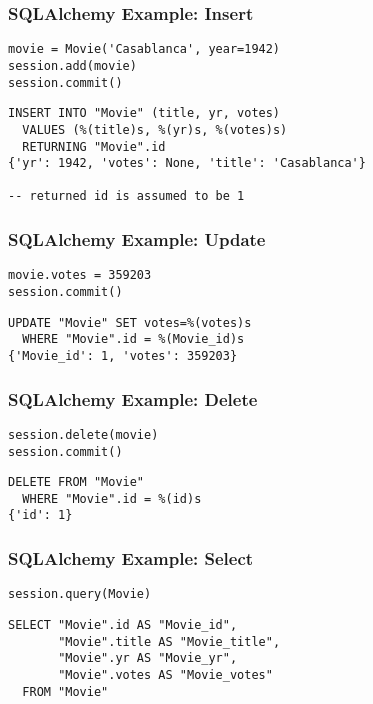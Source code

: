 \documentclass[dvipsnames]{beamer}
\theoremstyle{plain}
\begin{document}
\begin{frame}[fragile]
  \frametitle{SQLAlchemy Example: Insert}

  \begin{lstlisting}
movie = Movie('Casablanca', year=1942)
session.add(movie)
session.commit()
  \end{lstlisting}

  \begin{lstlisting}[language=FullSQL]
INSERT INTO "Movie" (title, yr, votes)
  VALUES (%(title)s, %(yr)s, %(votes)s)
  RETURNING "Movie".id
{'yr': 1942, 'votes': None, 'title': 'Casablanca'}

-- returned id is assumed to be 1
  \end{lstlisting}
\end{frame}

\begin{frame}[fragile]
  \frametitle{SQLAlchemy Example: Update}

  \begin{lstlisting}
movie.votes = 359203
session.commit()
  \end{lstlisting}

  \begin{lstlisting}[language=FullSQL]
UPDATE "Movie" SET votes=%(votes)s
  WHERE "Movie".id = %(Movie_id)s
{'Movie_id': 1, 'votes': 359203}
  \end{lstlisting}
\end{frame}

\begin{frame}[fragile]
  \frametitle{SQLAlchemy Example: Delete}

  \begin{lstlisting}
session.delete(movie)
session.commit()
  \end{lstlisting}

  \begin{lstlisting}[language=FullSQL]
DELETE FROM "Movie"
  WHERE "Movie".id = %(id)s
{'id': 1}
  \end{lstlisting}
\end{frame}

\begin{frame}[fragile]
  \frametitle{SQLAlchemy Example: Select}

  \begin{lstlisting}
session.query(Movie)
  \end{lstlisting}

  \begin{lstlisting}[language=FullSQL]
SELECT "Movie".id AS "Movie_id",
       "Movie".title AS "Movie_title",
       "Movie".yr AS "Movie_yr",
       "Movie".votes AS "Movie_votes"
  FROM "Movie"
  \end{lstlisting}
\end{frame}
\end{document}
